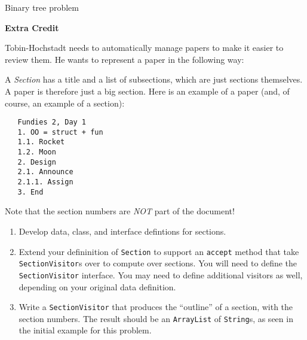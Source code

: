 \documentclass[12pt]{article}                   %
\def\pts#1{\marginpar{\footnotesize \raggedright  \fbox{#1 {\sc Points}}}}
\begin{document}
\vfill\thispagestyle{empty}
\newpage

\begin{problem} \pts{20}

 Binary tree problem

\ifrubric
\else
{}
\fi
\newpage
\newpage

\textbf{Extra Credit}

\end{problem}

\ifrubric
\else
{}
\fi
\newpage


\begin{problem} \pts{20}
\noindent
Tobin-Hochstadt needs to automatically manage papers to make it
easier to review them.  He wants to represent a paper in the following
way:

A \emph{Section} has a title and a list of subsections, which are just
sections themselves.  A paper is therefore just a big section.  Here
is an example of a paper (and, of course, an example of a section):

\begin{verbatim}
   Fundies 2, Day 1
   1. OO = struct + fun
   1.1. Rocket
   1.2. Moon
   2. Design
   2.1. Announce
   2.1.1. Assign
   3. End
\end{verbatim}
Note that the section numbers are \emph{NOT} part of the document!

\bigskip

\begin{enumerate}

\item Develop data, class, and interface defintions for sections.  

\newpage

\noindent
\item Extend your defininition of \texttt{Section} to support an
\texttt{accept} method that take \texttt{SectionVisitor}s over to
compute over sections.  You will need to define the
\texttt{SectionVisitor} interface.  You may need to define additional
visitors as well, depending on your original data definition.

\newpage

\noindent
\item Write a \texttt{SectionVisitor} that produces the ``outline'' of a section, with the
section numbers.  The result should be an \texttt{ArrayList} of
\texttt{String}s, as seen in the initial example for this problem.


\end{enumerate}
\end{problem}
\end{document}
